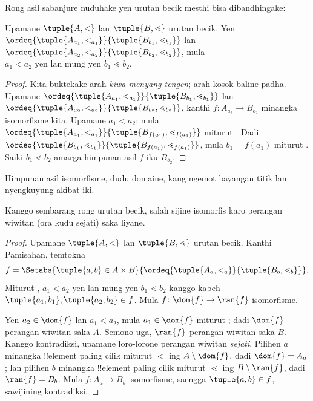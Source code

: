 \documentclass[../../../include/open-logic-section]{subfiles}
\begin{document}
Rong asil sabanjure nuduhake yen urutan becik mesthi
bisa dibandhingake:

\begin{lem}
Upamane $\tuple{A, <}$ lan $\tuple{B, \lessdot}$
urutan becik. Yen
$\ordeq{\tuple{A_{a_1}, <_{a_1}}}{\tuple{B_{b_1}, \lessdot_{b_1}}}$
lan $\ordeq{\tuple{A_{{a_2}}, <_{a_2}}}{\tuple{B_{{b_2}},
\lessdot_{b_2}}}$, mula
${a_1}  < {a_2} \text{ yen lan mung yen }{b_1} \lessdot {b_2}$.
\end{lem}

\begin{proof}
Kita buktekake arah \emph{kiwa menyang tengen}; arah
kosok baline padha. Upamane
$\ordeq{\tuple{A_{a_1}, <_{a_1}}}{\tuple{B_{b_1},
\lessdot_{b_1}}}$ lan $\ordeq{\tuple{A_{{a_2}},
<_{a_2}}}{\tuple{B_{{b_2}}, \lessdot_{b_2}}}$,
kanthi $f \colon A_{{a_2}} \to B_{{b_2}}$ minangka
isomorfisme kita. Upamane ${a_1} < {a_2}$; mula
$\ordeq{\tuple{A_{a_1}, <_{a_1}}}{\tuple{B_{f({a_1})},
\lessdot_{f({a_1})}}}$ miturut
. Dadi
$\ordeq{\tuple{B_{b_1}, \lessdot_{b_1}}}{\tuple{B_{f({a_1})},
\lessdot_{f({a_1})}}}$, mula ${b_1} = f({a_1})$
miturut . Saiki
${b_1} \lessdot {b_2}$ amarga himpunan asil $f$ iku
$B_{{b_2}}$.
\end{proof}
Himpunan asil isomorfisme, dudu domaine, kang ngemot bayangan titik lan nyengkuyung akibat iki.

\begin{thm}
Kanggo sembarang rong urutan becik, salah sijine
isomorfis karo perangan wiwitan (ora kudu sejati)
saka liyane.
\end{thm}

\begin{proof}
Upamane $\tuple{A, <}$ lan $\tuple{B, \lessdot}$
urutan becik. Kanthi Pamisahan, temtokna
\[
	f = \Setabs{\tuple{a, b} \in A \times B}{
		\ordeq{\tuple{A_a, <_a}}{\tuple{B_b, \lessdot_b}}}.
\]
Miturut , $a_1 < a_2$ yen lan
mung yen $b_1 \lessdot b_2$ kanggo kabeh
$\tuple{a_1, b_1}, \tuple{a_2, b_2} \in f$.
Mula $f \colon \dom{f} \to \ran{f}$ isomorfisme.

Yen $a_2 \in \dom{f}$ lan $a_1 < a_2$, mula
$a_1 \in \dom{f}$ miturut
; dadi $\dom{f}$
perangan wiwitan saka $A$. Semono uga, $\ran{f}$
perangan wiwitan saka $B$. Kanggo kontradiksi,
upamane loro-lorone perangan wiwitan \emph{sejati}.
Pilihen $a$ minangka !!{element} paling cilik miturut
$<$ ing $A \setminus \dom{f}$, dadi
$\dom{f} = A_a$; lan pilihen $b$ minangka !!{element}
paling cilik miturut $\lessdot$ ing
$B \setminus \ran{f}$, dadi $\ran{f} = B_b$.
Mula $f \colon A_a \to B_b$ isomorfisme, saengga
$\tuple{a, b} \in f$, sawijining kontradiksi.
\end{proof}
\end{document}
